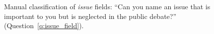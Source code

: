 \begin{figure}[h!]
    \caption[Manual classification of \textit{issue} fields]{Manual classification of \textit{issue} fields: ``Can you name an issue that is important to you but is neglected in the public debate?'' (Question~\ref{q:issue_field}).
    }\label{fig:issue_field}
\end{figure}

